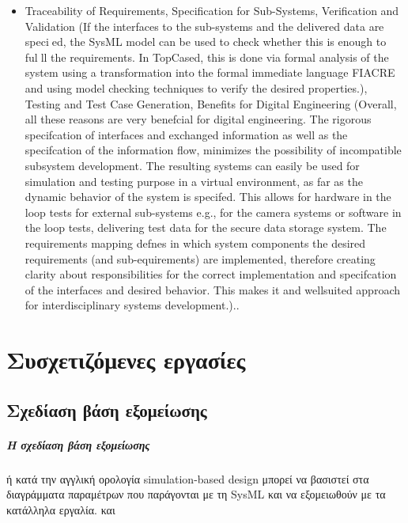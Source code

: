 \documentclass[a4paper,12pt,twoside]{report}
\begin{document}
\begin{itemize}
				\item Traceability of Requirements, Specification for Sub-Systems, Verification and Validation (If the interfaces to the sub-systems and the delivered data are specied, the SysML model can be used to check whether this is enough to fulll the requirements. In TopCased, this is done via formal analysis of the system using a transformation into the formal immediate language FIACRE and using model checking techniques to verify the desired properties.), Testing and Test Case Generation, Benefits for Digital Engineering (Overall, all these reasons are very benefcial for digital engineering. The rigorous specifcation of interfaces and exchanged information as well as the specifcation of the information flow, minimizes the possibility of incompatible subsystem development. The resulting systems can easily be used for simulation and testing purpose in a virtual environment, as far as the dynamic behavior of the system is specifed. This allows for hardware in the loop tests for external sub-systems e.g., for the camera systems or software in the loop tests, delivering test data for the secure data storage system. The requirements mapping defnes in which system components the desired requirements (and sub-equirements) are implemented, therefore creating clarity about responsibilities for the correct implementation and specifcation of the interfaces and desired behavior. This makes it and wellsuited approach for interdisciplinary systems development.).\cite{SysMLDigitalEngineering}.
			\end{itemize}
			

	\chapter{Συσχετιζόμενες εργασίες}
		\label{κεφ.:Συσχετιζόμενες εργασίες}

		\section{Σχεδίαση βάση εξομείωσης}
			\paragraph{Η σχεδίαση βάση εξομείωσης} {ή κατά την αγγλική ορολογία simulation-based design μπορεί να βασιστεί στα διαγράμματα παραμέτρων που παράγονται με τη SysML και να εξομειωθούν με τα κατάλληλα εργαλία. \cite{SimBasedDesignP1} και \cite{SimBasedDesignP2}
			}
\end{document}
